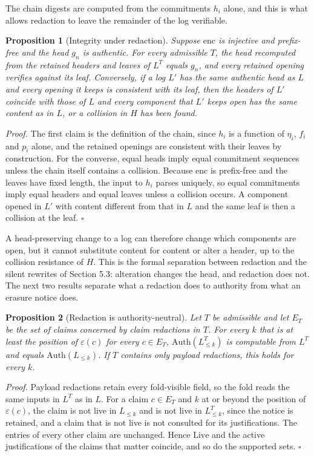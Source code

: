\documentclass[11pt]{article}
\theoremstyle{plain}
\newtheorem{proposition}{Proposition}
\theoremstyle{definition}
\theoremstyle{remark}
\begin{document}
The chain digests are computed from the commitments $h_i$ alone, and this is what allows redaction to leave the remainder of the log verifiable.

\begin{proposition}[Integrity under redaction]
Suppose $\mathrm{enc}$ is injective and prefix-free and the head $g_n$ is authentic. For every admissible $T$, the head recomputed from the retained headers and leaves of $L^T$ equals $g_n$, and every retained opening verifies against its leaf. Conversely, if a log $L'$ has the same authentic head as $L$ and every opening it keeps is consistent with its leaf, then the headers of $L'$ coincide with those of $L$ and every component that $L'$ keeps open has the same content as in $L$, or a collision in $H$ has been found.
\end{proposition}
\emph{Proof.} The first claim is the definition of the chain, since $h_i$ is a function of $\eta_i$, $f_i$ and $p_i$ alone, and the retained openings are consistent with their leaves by construction. For the converse, equal heads imply equal commitment sequences unless the chain itself contains a collision. Because $\mathrm{enc}$ is prefix-free and the leaves have fixed length, the input to $h_i$ parses uniquely, so equal commitments imply equal headers and equal leaves unless a collision occurs. A component opened in $L'$ with content different from that in $L$ and the same leaf is then a collision at the leaf. \hfill$\square$

A head-preserving change to a log can therefore change which components are open, but it cannot substitute content for content or alter a header, up to the collision resistance of $H$. This is the formal separation between redaction and the silent rewrites of Section 5.3: alteration changes the head, and redaction does not. The next two results separate what a redaction does to authority from what an erasure notice does.

\begin{proposition}[Redaction is authority-neutral]
Let $T$ be admissible and let $E_T$ be the set of claims concerned by claim redactions in $T$. For every $k$ that is at least the position of $\varepsilon(c)$ for every $c\in E_T$, $\mathrm{Auth}(L^T_{\le k})$ is computable from $L^T$ and equals $\mathrm{Auth}(L_{\le k})$. If $T$ contains only payload redactions, this holds for every $k$.
\end{proposition}
\emph{Proof.} Payload redactions retain every fold-visible field, so the fold reads the same inputs in $L^T$ as in $L$. For a claim $c\in E_T$ and $k$ at or beyond the position of $\varepsilon(c)$, the claim is not live in $L_{\le k}$ and is not live in $L^T_{\le k}$, since the notice is retained, and a claim that is not live is not consulted for its justifications. The entries of every other claim are unchanged. Hence $\mathrm{Live}$ and the active justifications of the claims that matter coincide, and so do the supported sets. \hfill$\square$
\end{document}
